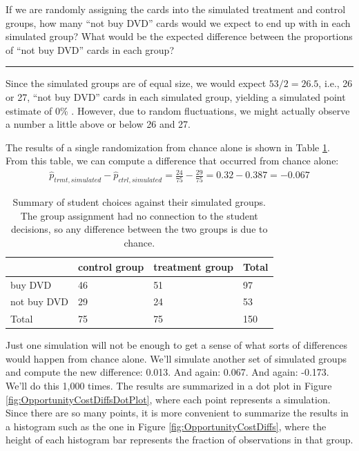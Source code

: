 \documentclass[
  10pt,
  openany]{book}
\theoremstyle{definition}
\theoremstyle{definition}
\theoremstyle{definition}
\theoremstyle{definition}
\theoremstyle{remark}
\begin{document}
If we are randomly assigning the cards into the simulated treatment and control groups, how many ``not buy DVD'' cards would we expect to end up with in each simulated group? What would be the expected difference between the proportions of ``not buy DVD'' cards in each group?

\begin{center}\rule{0.5\linewidth}{0.5pt}\end{center}

Since the simulated groups are of equal size, we would expect \(53 / 2 = 26.5\), i.e., 26 or 27, ``not buy DVD'' cards in each simulated group, yielding a simulated point estimate of 0\% . However, due to random fluctuations, we might actually observe a number a little above or below 26 and 27.

The results of a single randomization from chance alone is shown in Table \ref{tab:OpportunityCostTableSimulated}. From this table, we can compute a difference that occurred from chance alone: \begin{align*}
\hat{p}_{trmt, simulated} - \hat{p}_{ctrl, simulated}
 = \frac{24}{75} - \frac{29}{75}
 = 0.32 - 0.387
 = - 0.067
\end{align*}

\begin{table}
\centering
\caption{\label{tab:OpportunityCostTableSimulated}Summary of student choices against their simulated groups. The group assignment had no connection to the student decisions, so any difference between the two groups is due to chance.}
\centering
\begin{tabular}[t]{l|l|l|l}
\hline
 & control group & treatment group & Total\\
\hline
buy DVD & 46 & 51 & 97\\
\hline
not buy DVD & 29 & 24 & 53\\
\hline
Total & 75 & 75 & 150\\
\hline
\end{tabular}
\end{table}

Just one simulation will not be enough to get a sense of what sorts of differences would happen from chance alone. We'll simulate another set of simulated groups and compute the new difference: 0.013. And again: 0.067. And again: -0.173. We'll do this 1,000 times. The results are summarized in a dot plot in Figure \ref{fig:OpportunityCostDiffsDotPlot}, where each point represents a simulation. Since there are so many points, it is more convenient to summarize the results in a histogram such as the one in Figure \ref{fig:OpportunityCostDiffs}, where the height of each histogram bar represents the fraction of observations in that group.
\end{document}
